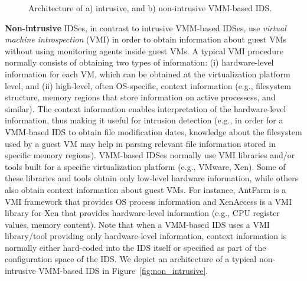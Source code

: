 \begin{figure*}[th]

\hfil
{}
\caption{Architecture of a) intrusive, and b) non-intrusive VMM-based IDS.}
\label{fig:recording}
\end{figure*}
 
\textbf{Non-intrusive} IDSes, in contrast to intrusive VMM-based IDSes, use \emph{virtual machine introspection} (VMI) in order to obtain information about guest VMs without using monitoring agents inside guest VMs. A typical VMI procedure normally consists of obtaining two types of information: (i) hardware-level information for each VM, which can be obtained at the virtualization platform level, and (ii) high-level, often OS-specific, context information (e.g., filesystem structure, memory regions that store information on active processess, and similar). The context information enables interpretation of the hardware-level information, thus making it useful for intrusion detection (e.g., in order for a VMM-based IDS to obtain file modification dates, knowledge about the filesystem used by a guest VM may help in parsing relevant file information stored in specific memory regions). VMM-based IDSes normally use VMI libraries and/or tools built for a specific virtualization platform (e.g., VMware, Xen). Some of these libraries and tools obtain only low-level hardware information, while others also obtain context information about guest VMs. For instance, AntFarm \cite{jones:antfarm} is a VMI framework that provides OS process information and XenAccess \cite{xenaccess} is a VMI library for Xen that provides hardware-level information (e.g., CPU register values, memory content). Note that when a VMM-based IDS uses a VMI library/tool providing only hardware-level information, context information is normally either hard-coded into the IDS itself or specified as part of the configuration space of the IDS. We depict an architecture of a typical non-intrusive VMM-based IDS in Figure~\ref{fig:non_intrusive}. 

